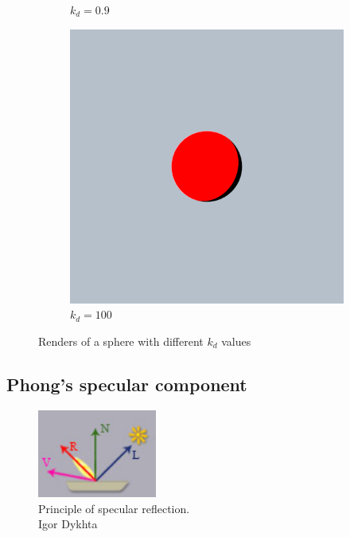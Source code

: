 \documentclass{article}
\begin{document}
\begin{figure}[h]
\begin{subfigure}{0.2\textwidth}
		\caption{$k_{d} = 0.9$}
		\label{fig:diffuse_0.9}
	\end{subfigure}%
	\hfill
	\begin{subfigure}{0.2\textwidth}
		\includegraphics[width=\textwidth]{diffuse_100}
		\caption{$k_{d} = 100$}
		\label{fig:diffuse_100}
	\end{subfigure}%
	\hfill
	
	\caption{Renders of a sphere with different $k_{d}$ values}
	\label{fig:diffuse}
\end{figure}

\newpage

\subsection*{Phong's specular component}
\begin{figure}
	\centering
	\includegraphics[width=0.35\textwidth]{specular_reflection_principle}
	\caption{Principle of specular reflection.\\ Igor Dykhta}
	\label{fig:specular_reflection_principle}
\end{figure}
\end{document}
